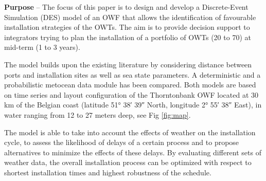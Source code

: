 \textbf{Purpose} --
The focus of this paper is to design and develop a Discrete-Event Simulation (DES) model of an OWF that allows the identification of favourable installation strategies of the OWTs. The aim is to provide decision support to integrators trying to plan the installation of a portfolio of OWTs (20 to 70) at mid-term (1 to 3 years).


The model builds upon the existing literature by considering distance between ports and installation sites as well as sea state parameters. A deterministic and a probabilistic metocean data module has been compared. Both models are based on time series and layout configuration of the Thorntonbank OWF located at 30 km of the Belgian coast (latitude 51° 38′ 39″ North, longitude 2° 55′ 38″ East), in water ranging from 12 to 27 meters deep, see Fig \ref{fig:map}.

The model is able to take into account the effects of weather on the installation cycle, to assess the likelihood of delays of a certain process and to propose alternatives to minimize the effects of these delays. By evaluating different sets of weather data, the overall installation process can be optimized with respect to shortest installation times and highest robustness of the schedule. %


